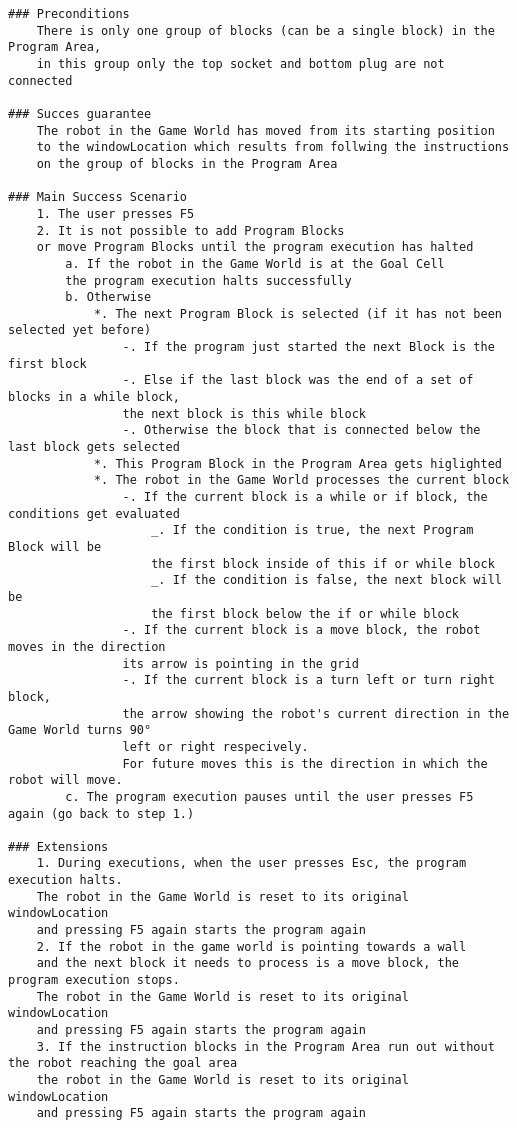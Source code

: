 \documentclass{article}
\begin{document}
\begin{verbatim}
### Preconditions
    There is only one group of blocks (can be a single block) in the Program Area, 
    in this group only the top socket and bottom plug are not connected 

### Succes guarantee
    The robot in the Game World has moved from its starting position 
    to the windowLocation which results from follwing the instructions
    on the group of blocks in the Program Area

### Main Success Scenario
    1. The user presses F5
    2. It is not possible to add Program Blocks 
    or move Program Blocks until the program execution has halted
        a. If the robot in the Game World is at the Goal Cell
        the program execution halts successfully
        b. Otherwise
            *. The next Program Block is selected (if it has not been selected yet before)
                -. If the program just started the next Block is the first block
                -. Else if the last block was the end of a set of blocks in a while block,
                the next block is this while block
                -. Otherwise the block that is connected below the last block gets selected
            *. This Program Block in the Program Area gets higlighted
            *. The robot in the Game World processes the current block
                -. If the current block is a while or if block, the conditions get evaluated
                    _. If the condition is true, the next Program Block will be 
                    the first block inside of this if or while block
                    _. If the condition is false, the next block will be 
                    the first block below the if or while block
                -. If the current block is a move block, the robot moves in the direction
                its arrow is pointing in the grid
                -. If the current block is a turn left or turn right block, 
                the arrow showing the robot's current direction in the Game World turns 90°
                left or right respecively. 
                For future moves this is the direction in which the robot will move.
        c. The program execution pauses until the user presses F5 again (go back to step 1.)
 
### Extensions
    1. During executions, when the user presses Esc, the program execution halts. 
    The robot in the Game World is reset to its original windowLocation
    and pressing F5 again starts the program again
    2. If the robot in the game world is pointing towards a wall 
    and the next block it needs to process is a move block, the program execution stops. 
    The robot in the Game World is reset to its original windowLocation
    and pressing F5 again starts the program again
    3. If the instruction blocks in the Program Area run out without the robot reaching the goal area
    the robot in the Game World is reset to its original windowLocation
    and pressing F5 again starts the program again
\end{verbatim}
\end{document}
